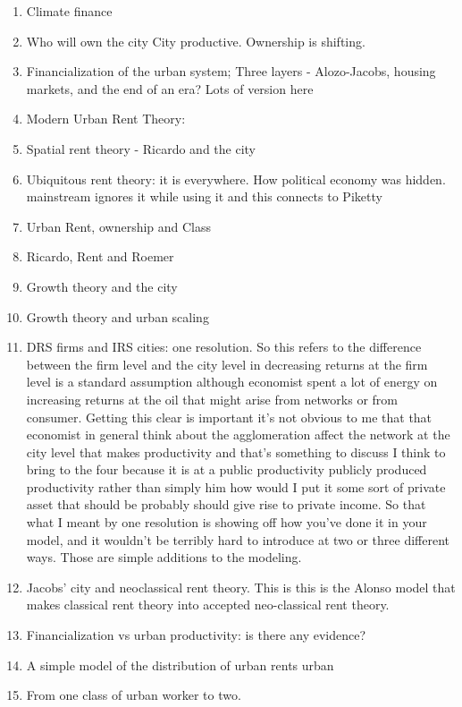 \documentclass[]{article}
\begin{document}
 
\begin{enumerate}
    \item Climate finance 
    \item Who will own  the city City  productive. Ownership is shifting.
    \item {\color{red!30}Financialization of the urban system; Three layers - Alozo-Jacobs, housing markets, and the end of an era? }
Lots of version here
    \item Modern Urban Rent Theory: 
    \item Spatial rent theory - Ricardo and the city
    \item {\color{red!30} Ubiquitous rent theory: it is everywhere. How political economy was hidden. mainstream ignores it while using it and this connects to Piketty}
    \item Urban Rent, ownership and Class 
    \item Ricardo, Rent and Roemer
    \item Growth theory and the city
    \item Growth theory and urban scaling
    \item DRS firms and IRS cities: one resolution.
So this refers to the difference between the firm level and the city level in decreasing returns at the firm level is a standard assumption although economist spent a lot of energy on increasing returns at the oil that might arise from networks or from consumer. Getting this clear is important it's not obvious to me that that economist in general think about the agglomeration affect the network at the city level that makes productivity and that's something to discuss I think to bring to the four because it is at a public productivity publicly produced productivity rather than simply him how would I put it some sort of private asset that should be probably should give rise to private income. So that what I meant by one resolution is showing off how you've done it in your model, and it wouldn't be terribly hard to introduce at two or three different ways. Those are simple additions to the modeling.
    \item Jacobs' city and neoclassical rent theory. This is this is the Alonso model that makes classical rent theory into accepted neo-classical rent theory.
    \item Financialization vs urban productivity: is there any evidence?
    \item A simple model of the distribution of urban rents urban 
    \item From one class of urban worker to two.

\end{enumerate}
\end{document}

